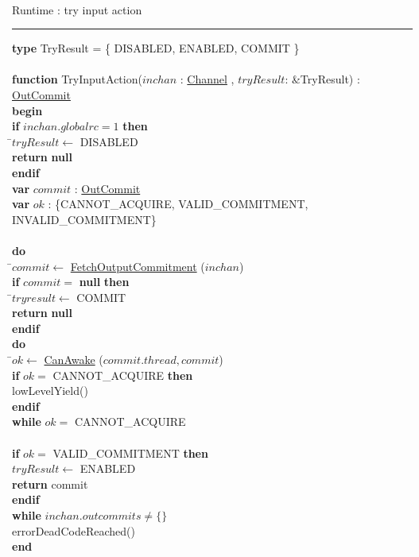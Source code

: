 \documentclass[a4paper,11pt]{article}
\newenvironment{program}{
  \begin{sffamily}
  \begin{scriptsize}
  \begin{tabbing}}
 {\end{tabbing}
  \end{scriptsize}
  \end{sffamily}}
\newcommand{\kw}[1]{\textsf{\textbf{#1}}}
\newcommand{\pindent}{\hspace{2em}\=}
\newcommand{\synchro}[1]{\textcolor{synchrocolor}{#1}}
\newcommand{\algotitle}[1]{\noindent\\ \noindent#1\par\nobreak\vspace{3pt}\hrule\vspace{6pt}}
\newcommand{\algosection}[1]{
  \phantomsection
  \algotitle{#1}
}
\newcommand{\myref}[1]{
  \hyperref[#1]{#1}
}
\begin{document}
\algosection{Runtime : try input action}
\begin{program}
  \kw{type} TryResult = \{ DISABLED, ENABLED, COMMIT \} \\
\\
  \kw{function} TryInputAction($inchan$ : \myref{Channel} , $tryResult$: \&TryResult) : \myref{OutCommit} \\
  \kw{begin} \\
  \pindent\kw{if} $inchan.globalrc = 1$ \kw{then} \\
  \>\pindent$tryResult \leftarrow$ DISABLED \\
  \>\>\kw{return} \kw{null} \\
  \>\kw{endif} \\
  \>\kw{var} $commit$ : \myref{OutCommit} \\
  \>\kw{var} $ok$ : \{CANNOT\_ACQUIRE, VALID\_COMMITMENT, INVALID\_COMMITMENT\} \\
  \>\\
  \>\kw{do} \\
  \>\pindent$commit \leftarrow$ \myref{FetchOutputCommitment}($inchan$) \\
  \>\>\kw{if} $commit =$ \kw{null} \kw{then} \\
  \>\>\pindent$tryresult \leftarrow$ COMMIT \\
  \>\>\>\kw{return} \kw{null} \\
  \>\>\kw{endif} \\

  \>\>\kw{do} \\
  \>\>\pindent$ok \leftarrow$ \myref{CanAwake}($commit.thread, commit$) \\
  \>\>\>\kw{if} $ok =$ CANNOT\_ACQUIRE \kw{then} \\
  \>\>\>\pindent\synchro{lowLevelYield()} \\
  \>\>\>\kw{endif} \\
  \>\>\kw{while} $ok =$ CANNOT\_ACQUIRE \\
  \>\>\\
  \>\>\kw{if} $ok =$ VALID\_COMMITMENT \kw{then} \\
  \>\>\> $tryResult \leftarrow$ ENABLED \\
  \>\>\> \kw{return} commit \\
  \>\>\kw{endif} \\
  \>\kw{while} $inchan.outcommits \neq \{\}$ \\
  \> errorDeadCodeReached() \\
  \kw{end}
\end{program}
\end{document}
